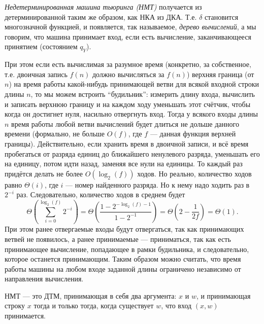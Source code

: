 \documentclass[12pt,a4paper]{article}
\begin{document}
    \begin{definition}
        \emph{Недетерминированная машина тьюринга (НМТ)} получается из детерминированной таким же образом, как НКА из ДКА. Т.е. $\delta$ становится многозначной функцией, и появляется, так называемое, \emph{дерево вычислений}, а мы говорим, что машина принимает вход, если есть вычисление, заканчивающееся принятием (состоянием $q_Y$).

        При этом если есть вычислимая за разумное время (конкретно, за собственное, т.е. двоичная запись $f(n)$ должно вычисляться за $f(n)$) верхняя граница (от $n$) на время работы какой-нибудь принимающей ветви для всякой входной строки длины $n$, то мы можем встроить ``будильник'': измерить длину входа, вычислить и записать верхнюю границу и на каждом ходу уменьшать этот счётчик, чтобы когда он достигнет нуля, насильно отвергнуть вход. Тогда у всякого входы длины $n$ время работы любой ветви вычислений будет длиться не дольше данного времени (формально, не больше $O(f)$, где $f$ --- данная функция верхней границы). Действительно, если хранить время в двоичной записи, и всё время пробегаться от разряда единиц до ближайшего ненулевого разряда, уменьшать его на единицу, потом идти назад, заменяя все нули на единицы. То каждый раз придётся делать не более $O(\log_2(f))$ ходов. Но реально, количество ходов равно $\Theta(i)$, где $i$ --- номер найденного разряда. Но к нему надо ходить раз в $2^{-i}$ раз. Следовательно, количество ходов в среднем будет
        \[
            \Theta\left(\sum_{i=0}^{\log_2(f)} 2^{-i}\right)
            = \Theta\left(\frac{1 - 2^{-\log_2(f)-1}}{1-2^{-1}}\right)
            = \Theta\left(2 - \frac{1}{2f}\right)
            = \Theta(1).
        \]
        При этом ранее отвергаемые входы будут отвергаться, так как принимающих ветвей не появилось, а ранее принимаемые --- приниматься, так как есть принимающее вычисление, попадающее в рамки будильника, и следовательно, которое останется принимающим. Таким образом можно считать, что время работы машины на любом входе заданной длины ограничено независимо от направления вычисления.
    \end{definition}

    \begin{definition}[альтернативное]
        НМТ --- это ДТМ, принимающая в себя два аргумента: $x$ и $w$, и принимающая строку $x$ тогда и только тогда, когда существует $w$, что вход $(x, w)$ принимается. 
    \end{definition}
\end{document}

